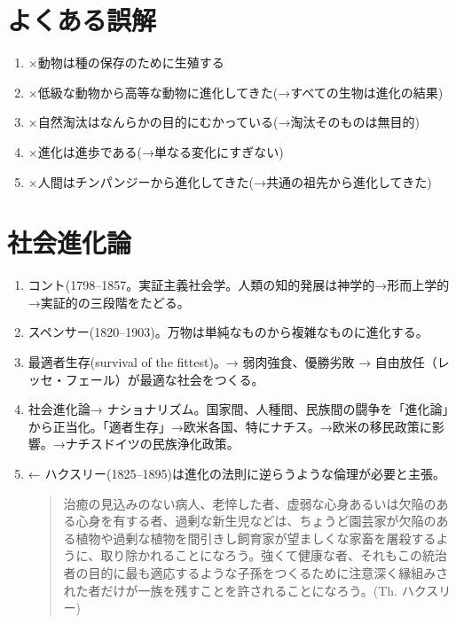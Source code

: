 \documentclass[dvipdfmx]{jsarticle}
\begin{document}
\section{よくある誤解}

\begin{enumerate}

 \item ×動物は種の保存のために生殖する
 \item ×低級な動物から高等な動物に進化してきた(→すべての生物は進化の結果)
 \item ×自然淘汰はなんらかの目的にむかっている(→淘汰そのものは無目的)
 \item ×進化は進歩である(→単なる変化にすぎない)
 \item ×人間はチンパンジーから進化してきた(→共通の祖先から進化してきた)

\end{enumerate}


\section{社会進化論}
\begin{enumerate}
\item コント(1798--1857。実証主義社会学。人類の知的発展は神学的→形而上学的→実証的の三段階をたどる。
\item スペンサー(1820--1903)。万物は単純なものから複雑なものに進化する。
\item 最適者生存(survival of the fittest)。→ 弱肉強食、優勝劣敗 → 自由放任（レッセ・フェール）が最適な社会をつくる。

\item 社会進化論→ ナショナリズム。国家間、人種間、民族間の闘争を「進化論」から正当化。「適者生存」→欧米各国、特にナチス。→欧米の移民政策に影響。→ナチスドイツの民族浄化政策。
\item ← ハクスリー(1825--1895)は進化の法則に逆らうような倫理が必要と主張。
\begin{quote}
  治癒の見込みのない病人、老悴した者、虚弱な心身あるいは欠陥のある心身を有する者、過剰な新生児などは、ちょうど園芸家が欠陥のある植物や過剰な植物を間引きし飼育家が望ましくな家畜を屠殺するように、取り除かれることになろう。強くて健康な者、それもこの統治者の目的に最も適応するような子孫をつくるために注意深く縁組みされた者だけが一族を残すことを許されることになろう。(Th. ハクスリー)
\end{quote}

\end{enumerate}
\end{document}
